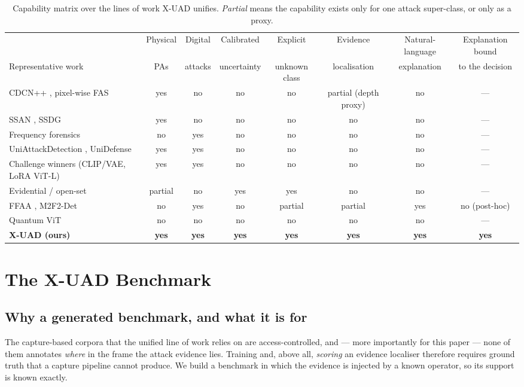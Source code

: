 \documentclass[conference]{IEEEtran}
\begin{document}
\begin{table}[t]
\centering
\caption{Capability matrix over the lines of work X-UAD unifies. \emph{Partial}
means the capability exists only for one attack super-class, or only as a proxy.}
\label{tab:gap}
\footnotesize
\setlength{\tabcolsep}{4pt}
\begin{tabular}{lccccccc}
\toprule
 & Physical & Digital & Calibrated & Explicit & Evidence & Natural-language & Explanation bound \\
Representative work & PAs & attacks & uncertainty & unknown class & localisation & explanation & to the decision \\
\midrule
CDCN++ \cite{yu2020cdcn}, pixel-wise FAS \cite{yu2021revisiting} & yes & no & no & no & partial (depth proxy) & no & --- \\
SSAN \cite{wang2022ssan}, SSDG \cite{jia2020ssdg} & yes & no & no & no & no & no & --- \\
Frequency forensics \cite{frank2020frequency,wang2020cnnspot} & no & yes & no & no & no & no & --- \\
UniAttackDetection \cite{yu2024unified}, UniDefense \cite{zhang2024unidefense} & yes & yes & no & no & no & no & --- \\
Challenge winners \cite{ma2025uniattackplus} (CLIP/VAE, LoRA ViT-L) & yes & yes & no & no & no & no & --- \\
Evidential / open-set \cite{sensoy2018edl,liu2024openset} & partial & no & yes & yes & no & no & --- \\
FFAA \cite{huang2024ffaa}, M2F2-Det \cite{guo2025m2f2det} & no & yes & no & partial & partial & yes & no (post-hoc) \\
Quantum ViT \cite{cherrat2024qvt,evans2025on} & no & no & no & no & no & no & --- \\
\midrule
\textbf{X-UAD (ours)} & \textbf{yes} & \textbf{yes} & \textbf{yes} & \textbf{yes} & \textbf{yes} & \textbf{yes} & \textbf{yes} \\
\bottomrule
\end{tabular}
\end{table}

\section{The X-UAD Benchmark}\label{sec:bench}

\subsection{Why a generated benchmark, and what it is for}
The capture-based corpora that the unified line of work relies on
\cite{yu2024unified,ma2025uniattackplus} are access-controlled, and --- more
importantly for this paper --- none of them annotates \emph{where} in the frame the
attack evidence lies. Training and, above all, \emph{scoring} an evidence
localiser therefore requires ground truth that a capture pipeline cannot produce.
We build a benchmark in which the evidence is injected by a known operator, so its
support is known exactly.
\end{document}
